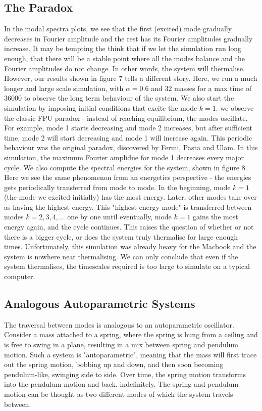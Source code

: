 \documentclass{article}
\begin{document}
\subsection{The Paradox}
In the modal spectra plots, we see that the first (excited) mode gradually decreases
in Fourier amplitude and the rest has its Fourier amplitudes gradually increase.
It may be tempting the think that if we let the simulation run long enough, that there will 
be a stable point where all the modes balance and the Fourier amplitudes do not change. In other words, 
the system will thermalise. However, our results shown in figure 7 tells a different story. Here, 
we run a much longer and large scale simulation, with $\alpha=0.6$ and 32 masses for a max time of 
36000 to observe the long term behaviour of the system. 
We also start the simulation by imposing initial conditions that excite the mode $k=1$. 
 we observe the classic FPU paradox - 
instead of reaching equilibrium, the modes oscillate. For example, mode 1 starts decreasing and 
mode 2 increases, but after sufficient time, mode 2 will start decreasing and mode 1 will increase again. 
This periodic behaviour was the original paradox, discovered by Fermi, Pasta and Ulam. 
In this simulation, the maximum Fourier amplidue for mode 1 decreases every major cycle.
We also compute the 
spectral energies for the system, shown in figure 8. Here we see the same phenomenon 
from an energetics perspective - the energies gets 
periodically transferred from mode to mode. In the beginning,
 mode $k=1$ (the mode we excited initially) has the most energy. Later, 
other modes take over as having the highest energy. This "highest energy mode" is transferred 
between modes $k=2,3,4,...$ one by one until eventually, mode $k=1$ 
gains the most energy again, and the cycle continues. 
This raises the question of whether or not there is a bigger cycle, or does 
the system truly thermalise for large enough times. 
Unfortunately, this simulation was already heavy for the Macbook and the system is 
nowhere near thermalising. We can only conclude that even if the system thermalises,
the timescales required is too large to simulate on a typical computer. 
\subsection{Analogous Autoparametric Systems}
The traversal between modes is analogous to an autoparametric oscillator. 
Consider a mass attached to a spring, where the spring is hung from a ceiling and 
is free to swing in a plane, resulting in a mix between spring and pendulum motion. 
Such a system is "autoparametric", meaning that the mass will first trace out 
the spring motion, bobbing up and down, and then soon becoming pendulum-like,
 swinging side to side. Over time, the 
spring motion transforms into the pendulum motion and back, 
indefinitely.
The spring and pendulum motion can be 
thought as two different modes of which the system travels between.
\end{document}
